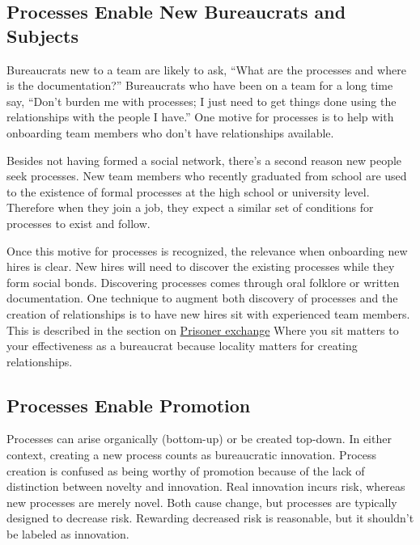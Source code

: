 \subsection*{Processes Enable New Bureaucrats and Subjects}

Bureaucrats new to a team are likely to ask, ``What are the processes and where is the documentation?'' Bureaucrats who have been on a team for a long time say, ``Don't burden me with processes; I just need to get things done using the relationships with the people I have.'' One motive for processes is to help with onboarding team members who don't have relationships available.

Besides not having formed a social network, there's a second reason new people seek processes. New team members who recently graduated from school are used to the existence of formal processes at the high school or university level. Therefore when they join a job, they expect a similar set of conditions for processes to exist and follow.

Once this motive for processes is recognized, the relevance when onboarding new hires is clear. New hires will need to discover the existing processes while they form social bonds. Discovering processes comes through oral folklore or written documentation. One technique to augment both discovery of processes  and the creation of relationships is to have new hires sit with experienced team members.
%
%
This is described in the section on  
\hyperref[sec:prisoner-exchange]{Prisoner exchange}%
\iftoggle{haspagenumbers}{ on page~\pageref{sec:prisoner-exchange}.}{.}
Where you sit matters to your effectiveness as a bureaucrat because locality matters for creating relationships.

\subsection*{Processes Enable Promotion}

Processes can arise organically (bottom-up) or be created top-down. In either context, creating a new process counts as bureaucratic innovation. Process creation is confused as being worthy of promotion because of the lack of distinction between novelty and innovation. Real innovation incurs risk, whereas new processes are merely novel. Both cause change, but processes are typically designed to decrease risk. Rewarding decreased risk is reasonable, but it shouldn't be labeled as innovation.

